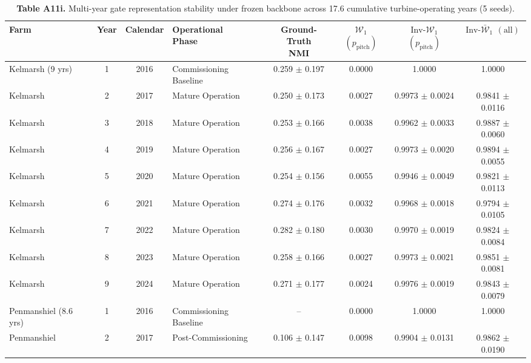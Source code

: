 \documentclass[
  journal]{IEEEtran}
\begin{document}
\begin{table}[!t]
\centering
\fontsize{8.0pt}{9.2pt}\selectfont
\setlength{\tabcolsep}{2.5pt}
\renewcommand{\arraystretch}{1.03}
\caption*{\textbf{Table A11i.} Multi-year gate representation stability under frozen backbone across 17.6 cumulative turbine-operating years (5 seeds).}
%
\begin{tabular*}{\textwidth}{@{\extracolsep{\fill}}l c c l c c c c@{}}
\toprule
Farm & Year & Calendar & \shortstack[l]{Operational\\Phase} & \shortstack{Ground-Truth\\NMI} & \shortstack{$\mathcal{W}_1$\\$(p_{\mathrm{pitch}})$} & \shortstack{$\text{Inv-}\mathcal{W}_1$\\$(p_{\mathrm{pitch}})$} & \shortstack{$\text{Inv-}\bar{\mathcal{W}}_1$\\$(\text{all})$} \\
\midrule
Kelmarsh (9 yrs) & 1 & 2016 & Commissioning Baseline & 0.259 $\pm$ 0.197 & 0.0000 & 1.0000 & 1.0000 \\
Kelmarsh & 2 & 2017 & Mature Operation & 0.250 $\pm$ 0.173 & 0.0027 & 0.9973 $\pm$ 0.0024 & 0.9841 $\pm$ 0.0116 \\
Kelmarsh & 3 & 2018 & Mature Operation & 0.253 $\pm$ 0.166 & 0.0038 & 0.9962 $\pm$ 0.0033 & 0.9887 $\pm$ 0.0060 \\
Kelmarsh & 4 & 2019 & Mature Operation & 0.256 $\pm$ 0.167 & 0.0027 & 0.9973 $\pm$ 0.0020 & 0.9894 $\pm$ 0.0055 \\
Kelmarsh & 5 & 2020 & Mature Operation & 0.254 $\pm$ 0.156 & 0.0055 & 0.9946 $\pm$ 0.0049 & 0.9821 $\pm$ 0.0113 \\
Kelmarsh & 6 & 2021 & Mature Operation & 0.274 $\pm$ 0.176 & 0.0032 & 0.9968 $\pm$ 0.0018 & 0.9794 $\pm$ 0.0105 \\
Kelmarsh & 7 & 2022 & Mature Operation & 0.282 $\pm$ 0.180 & 0.0030 & 0.9970 $\pm$ 0.0019 & 0.9824 $\pm$ 0.0084 \\
Kelmarsh & 8 & 2023 & Mature Operation & 0.258 $\pm$ 0.166 & 0.0027 & 0.9973 $\pm$ 0.0021 & 0.9851 $\pm$ 0.0081 \\
Kelmarsh & 9 & 2024 & Mature Operation & 0.271 $\pm$ 0.177 & 0.0024 & 0.9976 $\pm$ 0.0019 & 0.9843 $\pm$ 0.0079 \\
\midrule
Penmanshiel (8.6 yrs) & 1 & 2016 & Commissioning Baseline & -- & 0.0000 & 1.0000 & 1.0000 \\
Penmanshiel & 2 & 2017 & Post-Commissioning & 0.106 $\pm$ 0.147 & 0.0098 & 0.9904 $\pm$ 0.0131 & 0.9862 $\pm$ 0.0190 \\

\end{tabular*}
\end{table}
\end{document}
